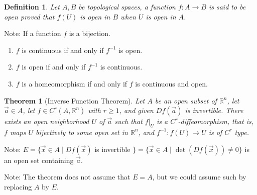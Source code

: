 \documentclass[11pt,oneside]{book}
\theoremstyle{break}
\theoremstyle{break}
\newtheorem{thm}{Theorem}[section]
\newtheorem{defn}{Definition}[corL]
\newcommand{\R}{\mathbb{R}}
\newcommand{\note}{\color{red}Note: \color{black}}
\begin{document}
\begin{defn}
Let $A,B$ be topological spaces, a function $f:A \to B$ is said to be open proved that $f(U)$ is open in $B$ when $U$ is open in $A$.
\end{defn}

\note If a function $f$ is a bijection.
\begin{enumerate}[topsep=3pt,itemsep=-1ex,partopsep=1ex,parsep=1ex]
\item $f$ is continuous if and only if $f^{-1}$ is open.
\item $f$ is open if and only if $f^{-1}$ is continuous.
\item $f$ is a homeomorphism if and only if $f$ is continuous and open.\\
\end{enumerate}

\begin{thm}[\color{red}Inverse Function Theorem\color{black}]
Let $A $ be an open subset of $\R^n$, let $\vec{a}\in A$, let $f\in C^r(A,\R^n)$ with $r\geq 1$, and given $Df(\vec{a})$ is invertible. There exists an open neighborhood $U$ of $\vec{a}$ such that $f|_U$ is a $C^r$-diffeomorphism, that is, $f$ maps $U$ bijectively to some open set in $\R^n$, and $f^{-1}:f(U) \to U$ is of $C^r$ type. 
\end{thm}
\note $E = \{ \vec{x}\in A\mid Df(\vec{x})$ is invertible $\} = \{\vec{x}\in A \mid \det(Df(\vec{x})) \neq 0\}$ is an open set containing $\vec{a}$. 

\note The theorem does not assume that $E=A$, but we could assume such by replacing $A$ by $E$.
\end{document}
